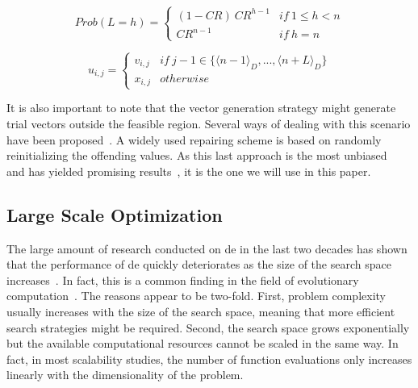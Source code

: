 \documentclass[preprint,3p]{elsarticle}
\newcommand{\DE}{{\sc de}}
\begin{document}
\begin{equation}
	\label{eq:geometric_dist}
	Prob(L=h) = \left \{
	\begin{array}{ll}
		(1 - CR)\ CR^{h-1} & if \ 1 \leq h < n \\
		CR^{n-1}                 & if \ h = n
	\end{array} \right.
\end{equation}

\begin{equation}
	\label{eq:exp}
 u_{i,j} = \left \{
 \begin{array}{ll}
 		v_{i,j} & if\ j-1 \in \{\langle n-1 \rangle _D , ..., \langle n + L \rangle _D\}\\
		x_{i,j} & otherwise
 \end{array} \right.
\end{equation}

It is also important to note that the vector generation strategy might
generate trial vectors outside the feasible region.
%
Several ways of dealing with this scenario have been proposed~\cite{Price:05}.
%
%
%
%
A widely used repairing scheme is based on randomly reinitializing the offending values.
%
As this last approach is the most unbiased~\cite{Price:05} and has yielded promising results~\cite{Qin:09}, it is the one we will use in this paper.

\subsection{Large Scale Optimization}

The large amount of research conducted on \DE{} in the last two decades has shown that the performance of \DE{} quickly
deteriorates as the size of the search space increases~\cite{Das:11}.
%
In fact, this is a common finding in the field of evolutionary computation~\cite{Weise:12}.
%
The reasons appear to be two-fold.
%
First, problem complexity usually increases with the size of the search space,
meaning that more efficient search strategies might be required.
%
Second, the search space grows exponentially but the available computational resources cannot be
scaled in the same way.
%
In fact, in most scalability studies, the number of function evaluations only increases linearly with the dimensionality of the problem.
\end{document}
